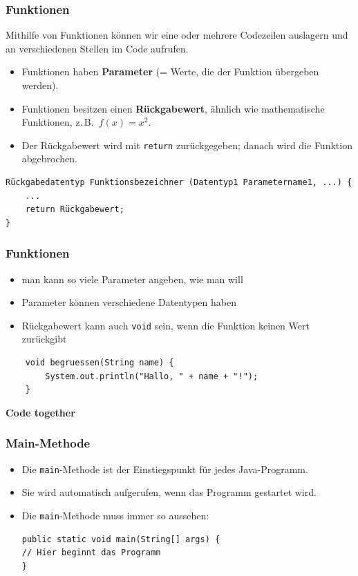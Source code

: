 \documentclass{../../presentation}
\begin{document}
\begin{frame}[fragile]
    \frametitle{Funktionen}
    Mithilfe von Funktionen können wir eine oder mehrere Codezeilen auslagern und an verschiedenen Stellen im Code aufrufen.
    \begin{itemize}
        \item Funktionen haben \textbf{Parameter} (= Werte, die der Funktion übergeben werden).
        \item Funktionen besitzen einen \textbf{Rückgabewert}, ähnlich wie mathematische Funktionen, z.\,B.\ $f(x) = x^2$.
        \item Der Rückgabewert wird mit \texttt{return} zurückgegeben; danach wird die Funktion abgebrochen.
    \end{itemize}
    \begin{verbatim}
Rückgabedatentyp Funktionsbezeichner (Datentyp1 Parametername1, ...) {
    ...
    return Rückgabewert;
}
\end{verbatim}
\end{frame}

\begin{frame}[fragile]
    \frametitle{Funktionen}
    \begin{itemize}
        \item man kann so viele Parameter angeben, wie man will
        \item Parameter können verschiedene Datentypen haben
        \item Rückgabewert kann auch \texttt{void} sein, wenn die Funktion keinen Wert zurückgibt
    \end{itemize}
    \begin{verbatim}
    void begruessen(String name) {
        System.out.println("Hallo, " + name + "!");
    }
    \end{verbatim}
\end{frame}

\begin{frame}[plain]
    \centering
    {\Huge\bfseries{Code together}}
\end{frame}

\begin{frame}[fragile]
    \frametitle{Main-Methode}
    \begin{itemize}
        \item Die \texttt{main}-Methode ist der Einstiegspunkt für jedes Java-Programm.
        \item Sie wird automatisch aufgerufen, wenn das Programm gestartet wird.
        \item Die \texttt{main}-Methode muss immer so aussehen:
              \begin{verbatim}
public static void main(String[] args) {
// Hier beginnt das Programm
}
\end{verbatim}
    \end{itemize}
\end{frame}
\end{document}
